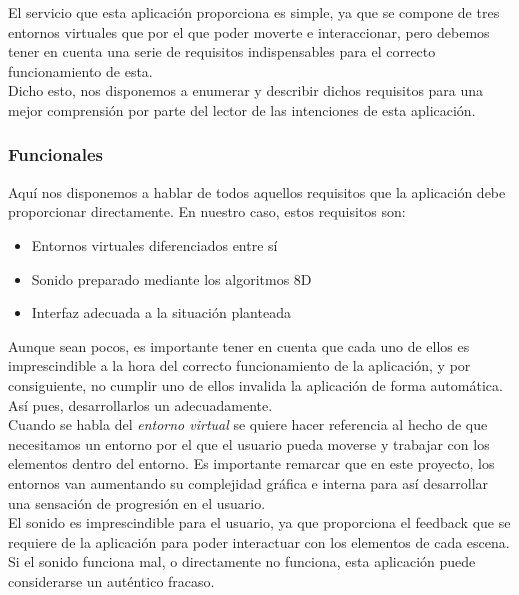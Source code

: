 \quad El servicio que esta aplicación proporciona es simple, ya que se compone de tres entornos virtuales que por el que poder moverte e interaccionar, pero debemos tener en cuenta una serie de requisitos indispensables para el correcto funcionamiento de esta.\\

\quad Dicho esto, nos disponemos a enumerar y describir dichos requisitos para una mejor comprensión por parte del lector de las intenciones de esta aplicación.\\

\subsubsection{Funcionales}

\quad Aquí nos disponemos a hablar de todos aquellos requisitos que la aplicación debe proporcionar directamente. En nuestro caso, estos requisitos son:

\begin{itemize}
	\item Entornos virtuales diferenciados entre sí
	\item Sonido preparado mediante los algoritmos 8D
	\item Interfaz adecuada a la situación planteada
\end{itemize}

\quad Aunque sean pocos, es importante tener en cuenta que cada uno de ellos es imprescindible a la hora del correcto funcionamiento de la aplicación, y por consiguiente, no cumplir uno de ellos invalida la aplicación de forma automática. Así pues, desarrollarlos un adecuadamente.\\

\quad Cuando se habla del \textit{entorno virtual} se quiere hacer referencia al hecho de que necesitamos un entorno por el que el usuario pueda moverse y trabajar con los elementos dentro del entorno. Es importante remarcar que en este proyecto, los entornos van aumentando su complejidad gráfica e interna para así desarrollar una sensación de progresión en el usuario.\\

\quad El sonido es imprescindible para el usuario, ya que proporciona el feedback que se requiere de la aplicación para poder interactuar con los elementos de cada escena. Si el sonido funciona mal, o directamente no funciona, esta aplicación puede considerarse un auténtico fracaso.\\


